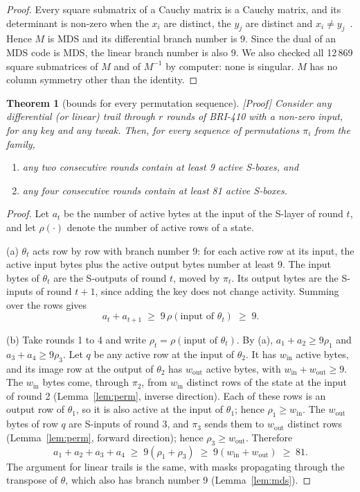 \documentclass[11pt,a4paper]{article}
\newtheorem{theorem}{Theorem}
\newcommand{\ev}[1]{\textup{\textsf{[#1]}}}
\begin{document}
\begin{proof}
Every square submatrix of a Cauchy matrix is a Cauchy matrix, and its determinant is non-zero when the $x_i$ are
distinct, the $y_j$ are distinct and $x_i \ne y_j$~\cite{MS77}. Hence $M$ is MDS and its differential branch
number is 9. Since the dual of an MDS code is MDS, the linear branch number is also 9. We also checked all
12\,869 square submatrices of $M$ and of $M^{-1}$ by computer: none is singular. $M$ has no column symmetry other
than the identity.
\end{proof}

\begin{theorem}[bounds for every permutation sequence]\label{thm:bounds}
\ev{Proof} Consider any differential (or linear) trail through $r$ rounds of BRI-410 with a non-zero input, for
any key and any tweak. Then, for every sequence of permutations $\pi_i$ from the family,
\begin{enumerate}[label=(\alph*)]
\item any two consecutive rounds contain at least 9 active S-boxes, and
\item any four consecutive rounds contain at least 81 active S-boxes.
\end{enumerate}
\end{theorem}

\begin{proof}
Let $a_t$ be the number of active bytes at the input of the S-layer of round $t$, and let $\rho(\cdot)$ denote
the number of active rows of a state.

(a) $\theta_t$ acts row by row with branch number 9: for each active row at its input, the active input bytes
plus the active output bytes number at least 9. The input bytes of $\theta_t$ are the S-outputs of round $t$,
moved by $\pi_t$. Its output bytes are the S-inputs of round $t+1$, since adding the key does not change
activity. Summing over the rows gives
\[
  a_t + a_{t+1} \;\ge\; 9\,\rho(\text{input of } \theta_t) \;\ge\; 9 .
\]

(b) Take rounds 1 to 4 and write $\rho_t = \rho(\text{input of } \theta_t)$. By (a),
$a_1 + a_2 \ge 9\rho_1$ and $a_3 + a_4 \ge 9\rho_3$. Let $q$ be any active row at the input of $\theta_2$. It has
$w_{\mathrm{in}}$ active bytes, and its image row at the output of $\theta_2$ has $w_{\mathrm{out}}$ active bytes,
with $w_{\mathrm{in}} + w_{\mathrm{out}} \ge 9$. The $w_{\mathrm{in}}$ bytes come, through $\pi_2$, from
$w_{\mathrm{in}}$ distinct rows of the state at the input of round 2 (Lemma~\ref{lem:perm}, inverse direction).
Each of these rows is an output row of $\theta_1$, so it is also active at the input of $\theta_1$; hence
$\rho_1 \ge w_{\mathrm{in}}$. The $w_{\mathrm{out}}$ bytes of row $q$ are S-inputs of round 3, and $\pi_3$ sends
them to $w_{\mathrm{out}}$ distinct rows (Lemma~\ref{lem:perm}, forward direction); hence
$\rho_3 \ge w_{\mathrm{out}}$. Therefore
\[
  a_1 + a_2 + a_3 + a_4 \;\ge\; 9(\rho_1 + \rho_3) \;\ge\; 9(w_{\mathrm{in}} + w_{\mathrm{out}}) \;\ge\; 81 .
\]
The argument for linear trails is the same, with masks propagating through the transpose of $\theta$, which also
has branch number 9 (Lemma~\ref{lem:mds}).
\end{proof}
\end{document}
